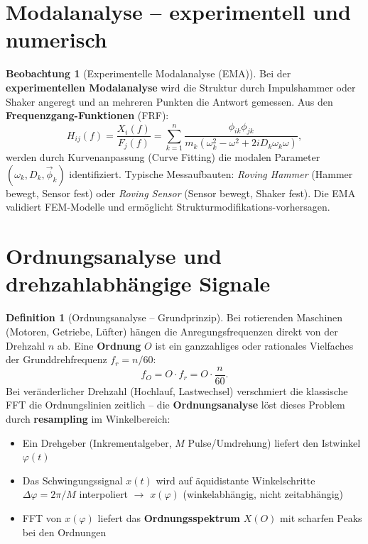 ﻿\documentclass[a4paper,12pt]{report}
\theoremstyle{definition}
\newtheorem{definition}{Definition}
\newtheorem{beobachtung}{Beobachtung}
\begin{document}
\section{Modalanalyse -- experimentell und numerisch}

\begin{beobachtung}[Experimentelle Modalanalyse (EMA)]
Bei der \textbf{experimentellen Modalanalyse} wird die Struktur
durch Impulshammer oder Shaker angeregt und an mehreren Punkten
die Antwort gemessen. Aus den \textbf{Frequenzgang-Funktionen} (FRF):
\[
  H_{ij}(f) = \frac{X_i(f)}{F_j(f)} = \sum_{k=1}^n \frac{\phi_{ik}\phi_{jk}}{m_k(\omega_k^2 - \omega^2 + 2iD_k\omega_k\omega)},
\]
werden durch Kurvenanpassung (Curve Fitting) die modalen Parameter
$(\omega_k, D_k, \vec{\phi}_k)$ identifiziert.
Typische Messaufbauten: \textit{Roving Hammer} (Hammer bewegt, Sensor fest)
oder \textit{Roving Sensor} (Sensor bewegt, Shaker fest).
Die EMA validiert FEM-Modelle und ermöglicht Strukturmodifikations-vorhersagen.
\end{beobachtung}


\section{Ordnungsanalyse und drehzahlabhängige Signale}

\begin{definition}[Ordnungsanalyse -- Grundprinzip]
Bei rotierenden Maschinen (Motoren, Getriebe, Lüfter) hängen die
Anregungsfrequenzen direkt von der Drehzahl $n$ ab.
Eine \textbf{Ordnung} $O$ ist ein ganzzahliges oder rationales Vielfaches
der Grunddrehfrequenz $f_r = n/60$:
\[
  f_O = O \cdot f_r = O \cdot \frac{n}{60}.
\]
Bei veränderlicher Drehzahl (Hochlauf, Lastwechsel) verschmiert die
klassische FFT die Ordnungslinien zeitlich -- die
\textbf{Ordnungsanalyse} löst dieses Problem durch
\textbf{resampling} im Winkelbereich:
\begin{itemize}
    \item[-] Ein Drehgeber (Inkrementalgeber, $M$ Pulse/Umdrehung) liefert
          den Istwinkel $\varphi(t)$
    \item[-] Das Schwingungssignal $x(t)$ wird auf äquidistante
          Winkelschritte $\Delta\varphi = 2\pi/M$ interpoliert
          $\to$ $x(\varphi)$ (winkelabhängig, nicht zeitabhängig)
    \item[-] FFT von $x(\varphi)$ liefert das \textbf{Ordnungsspektrum}
          $X(O)$ mit scharfen Peaks bei den Ordnungen
\end{itemize}
\end{definition}
\end{document}
